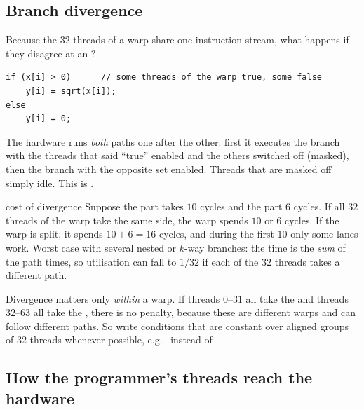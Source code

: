 \subsection{Branch divergence}

Because the $32$ threads of a warp share one instruction stream, what happens if they disagree at an ?
\begin{lstlisting}
if (x[i] > 0)      // some threads of the warp true, some false
    y[i] = sqrt(x[i]);
else
    y[i] = 0;
\end{lstlisting}
The hardware runs \emph{both} paths one after the other: first it executes the  branch with the threads that said ``true'' enabled and the others switched off (masked), then the 
branch with the opposite set enabled. Threads that are masked off simply idle.
This is .

\begin{workedex}{cost of divergence}
Suppose the  part takes $10$ cycles and the  part $6$ cycles.
If all $32$ threads of the warp take the same side, the warp spends $10$ or $6$ cycles.
If the warp is split, it spends $10+6=16$ cycles, and during the first $10$ only some lanes work.
Worst case with several nested or $k$-way branches: the time is the \emph{sum} of the path times, so
utilisation can fall to $1/32$ if each of the $32$ threads takes a different path.
\end{workedex}

\begin{pitfall}
Divergence matters only \emph{within} a warp. If threads $0$--$31$ all take the  and threads $32$--$63$ all take the ,
there is no penalty, because these are different warps and can follow different paths. So write conditions that
are constant over aligned groups of $32$ threads whenever possible, e.g.\  instead of .
\end{pitfall}

\subsection{How the programmer's threads reach the hardware}


